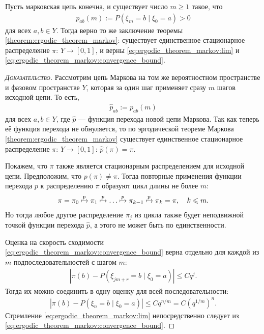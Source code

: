 \documentclass[../main.tex]{subfiles}
\begin{document}
\begin{crly}
 Пусть марковская цепь конечна, и существует число $ m \geqslant 1$ такое, что
 \begin{align*}
  p_{ab}(m) := P(\xi_m = b \mid \xi_0 = a) > 0
 \end{align*} для всех $ a,b \in Y $. Тогда верно то же заключение теоремы \ref{theorem:ergodic_theorem_markov}: существует единственное стационарное распределение $ \pi \colon\,Y \to [0,1] $, и верны \eqref{eq:ergodic_theorem_markov:lim} и \eqref{eq:ergodic_theorem_markov:convergence_bound}.
\end{crly}
\begin{proof}[\normalfont\textsc{Доказательство}]
 Рассмотрим цепь Маркова на том же вероятностном пространстве и фазовом пространстве $ Y $, которая за один шаг применяет сразу $ m $ шагов исходной цепи. То есть,
 \begin{align*}
  \hat p_{ab} := p_{ab}(m)
 \end{align*} для всех $ a,b \in Y$, где $ \hat p $ --- функция перехода новой цепи Маркова. Так как теперь её функция перехода не обнуляется, то по эргодической теореме Маркова \ref{theorem:ergodic_theorem_markov} существует единственное стационарное распределение $ \pi \colon\,Y \to [0,1] $: $ \hat p(\pi) = \pi $.

 Покажем, что $ \pi $ также является стационарным распределением для исходной цепи. Предположим, что $ p(\pi) \neq \pi $. Тогда повторные применения функции перехода $ p $ к распределению $ \pi $ образуют цикл длины не более $ m $:
 \begin{align*}
  \pi = \pi_0 \xmapsto{p} \pi_1 \xmapsto{p} \ldots \xmapsto{p} \pi_{k-1} \xmapsto p \pi_k = \pi, \quad k \leqslant m.
 \end{align*} Но тогда любое другое распределение $ \pi_j $ из цикла также будет неподвижной точкой функции перехода $ \hat p $, а этого не может быть по единственности.

 Оценка на скорость сходимости \eqref{eq:ergodic_theorem_markov:convergence_bound} верна отдельно для каждой из $ m $ подпоследовательностей с шагом $ m $:
 \begin{align*}
  \left| \pi(b) - P(\xi_{jm + r} = b \mid \xi_0 = a) \right| \leqslant C q^{j}.
 \end{align*} Тогда их можно соединить в одну оценку для всей последовательности:
 \begin{align*}
  \left| \pi(b) - P(\xi_n = b \mid \xi_0 = a) \right| \leqslant C q^{n / m} = C \left( q^{1 / m} \right)^{n}.
 \end{align*} Стремление \eqref{eq:ergodic_theorem_markov:lim} непосредственно следует из \eqref{eq:ergodic_theorem_markov:convergence_bound}.
\end{proof}
\end{document}
